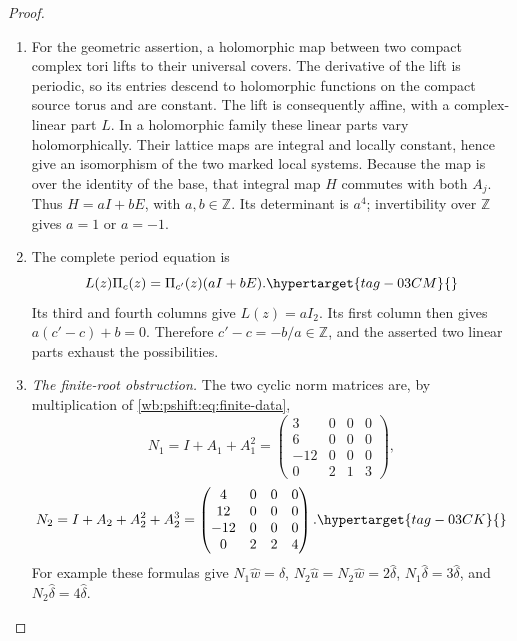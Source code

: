 \begin{proof}
\begin{enumerate}[label=\arabic*.,leftmargin=*]
\item For the geometric assertion, a holomorphic map between two compact
complex tori lifts to their universal covers. The derivative of the
lift is periodic, so its entries descend to holomorphic functions on
the compact source torus and are constant. The lift is consequently
affine, with a complex-linear part $L$. In a holomorphic family these
linear parts vary holomorphically. Their lattice maps are integral
and locally constant, hence give an isomorphism of the two marked
local systems. Because the map is over the identity of the base,
that integral map $H$ commutes with both $A_j$. Thus
$H=aI+bE$, with $a,b\in\mathbb Z$. Its determinant is $a^4$;
invertibility over $\mathbb Z$ gives $a=1$ or $a=-1$.

\item The complete period equation is
\begin{equation}
                   L(z)\Pi_c(z)=\Pi_{c'}(z)(aI+bE).
 \hypertarget{tag-03CM}{}\label{wb:pshift:eq:period-morphism}
\end{equation}
Its third and fourth columns give $L(z)=aI_2$. Its first column
then gives $a(c'-c)+b=0$. Therefore $c'-c=-b/a\in\mathbb Z$,
and the asserted two linear parts exhaust the possibilities.
\item \emph{The finite-root obstruction.}
The two cyclic norm matrices are, by multiplication of \eqref{wb:pshift:eq:finite-data},
\[
 N_1=I+A_1+A_1^2=
 \begin{pmatrix}3&0&0&0\\6&0&0&0\\-12&0&0&0\\0&2&1&3\end{pmatrix},
\]
\begin{equation}
 N_2=I+A_2+A_2^2+A_2^3=
 \begin{pmatrix}4&0&0&0\\12&0&0&0\\-12&0&0&0\\0&2&2&4\end{pmatrix}.
 \hypertarget{tag-03CK}{}\label{wb:pshift:eq:norms}
\end{equation}
For example these formulas give
$N_1\widehat w=\widehat\delta$,
$N_2\widehat u=N_2\widehat w=2\widehat\delta$,
$N_1\widehat\delta=3\widehat\delta$, and
$N_2\widehat\delta=4\widehat\delta$.


\end{enumerate}
\end{proof}
